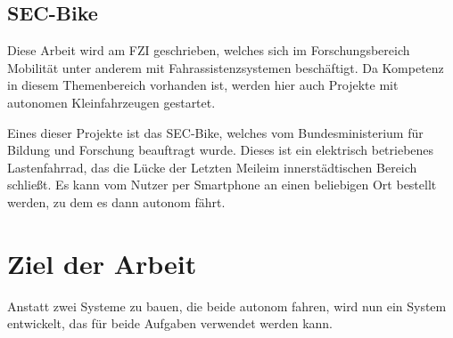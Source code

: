 \subsection{SEC-Bike}
\label{sec:secbike}

Diese Arbeit wird am FZI geschrieben, welches sich im Forschungsbereich Mobilität unter anderem mit Fahrassistenzsystemen beschäftigt. Da Kompetenz in diesem Themenbereich vorhanden ist, werden hier auch Projekte mit autonomen Kleinfahrzeugen gestartet.

Eines dieser Projekte ist das SEC-Bike, welches vom Bundesministerium für Bildung und Forschung beauftragt wurde. Dieses ist ein elektrisch betriebenes Lastenfahrrad, das die Lücke der \glqq Letzten Meile\grqq im innerstädtischen Bereich schließt. Es kann vom Nutzer per Smartphone an einen beliebigen Ort bestellt werden, zu dem es dann autonom fährt\cite{bmbfsecbike2017,fzisecbike2017}.

\section{Ziel der Arbeit}
\label{sec:zielderarbeit}

Anstatt zwei Systeme zu bauen, die beide autonom fahren, wird nun ein System entwickelt, das für beide Aufgaben verwendet werden kann.